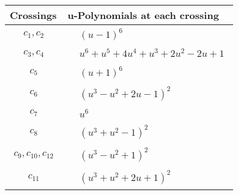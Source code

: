 \documentclass[1p]{elsarticle_modified}
\theoremstyle{definition}
\begin{document}
\begin{tabular}{m{50pt}|m{274pt}}
Crossings & \hspace{64pt}u-Polynomials at each crossing \\
\hline $$\begin{aligned}c_{1},c_{2}\end{aligned}$$&$\begin{aligned}
&(u-1)^6
\end{aligned}$\\
\hline $$\begin{aligned}c_{3},c_{4}\end{aligned}$$&$\begin{aligned}
&u^6+u^5+4 u^4+u^3+2 u^2-2 u+1
\end{aligned}$\\
\hline $$\begin{aligned}c_{5}\end{aligned}$$&$\begin{aligned}
&(u+1)^6
\end{aligned}$\\
\hline $$\begin{aligned}c_{6}\end{aligned}$$&$\begin{aligned}
&(u^3- u^2+2 u-1)^2
\end{aligned}$\\
\hline $$\begin{aligned}c_{7}\end{aligned}$$&$\begin{aligned}
&u^6
\end{aligned}$\\
\hline $$\begin{aligned}c_{8}\end{aligned}$$&$\begin{aligned}
&(u^3+u^2-1)^2
\end{aligned}$\\
\hline $$\begin{aligned}c_{9},c_{10},c_{12}\end{aligned}$$&$\begin{aligned}
&(u^3- u^2+1)^2
\end{aligned}$\\
\hline $$\begin{aligned}c_{11}\end{aligned}$$&$\begin{aligned}
&(u^3+u^2+2 u+1)^2
\end{aligned}$\\
\hline
\end{tabular}\\~\\
\end{document}
